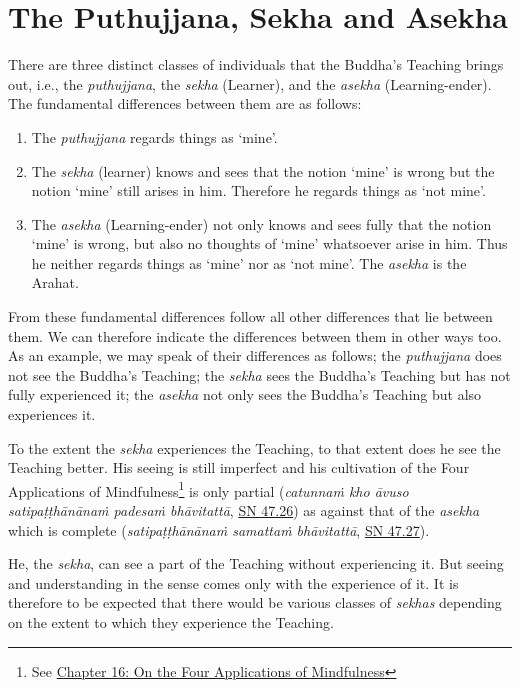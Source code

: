 \chapter{The Puthujjana, Sekha and Asekha}

There are three distinct classes of individuals that the Buddha's Teaching brings out, i.e., the \emph{puthujjana}, the \emph{sekha} (Learner), and the \emph{asekha} (Learning-ender). The fundamental differences between them are as follows:

\begin{enumerate}
\item
  The \emph{puthujjana} regards things as `mine'.
\item
  The \emph{sekha} (learner) knows and sees that the notion `mine' is wrong but the notion `mine' still arises in him. Therefore he regards things as `not mine'.
\item
  The \emph{asekha} (Learning-ender) not only knows and sees fully that the notion `mine' is wrong, but also no thoughts of `mine' whatsoever arise in him. Thus he neither regards things as `mine' nor as `not mine'. The \emph{asekha} is the Arahat.
\end{enumerate}

From these fundamental differences follow all other differences that lie between them. We can therefore indicate the differences between them in other ways too. As an example, we may speak of their differences as follows; the \emph{puthujjana} does not see the Buddha's Teaching; the \emph{sekha} sees the Buddha's Teaching but has not fully experienced it; the \emph{asekha} not only sees the Buddha's Teaching but also  experiences it.

To the extent the \emph{sekha} experiences the Teaching, to that extent does he see the Teaching better. His seeing is still imperfect and his cultivation of the Four Applications of Mindfulness\footnote{See \href{ch-16-satipatthana.xml\#start}{Chapter 16: On the Four Applications of Mindfulness}} is only partial (\emph{catunnaṁ kho āvuso satipaṭṭhānānaṁ padesaṁ bhāvitattā}, \href{https://suttacentral.net/sn47.26/en/bodhi}{SN 47.26}) as against that of the \emph{asekha} which is complete (\emph{satipaṭṭhānānaṁ samattaṁ bhāvitattā}, \href{https://suttacentral.net/sn47.27/en/bodhi}{SN 47.27}).

He, the \emph{sekha}, can see a part of the Teaching without experiencing it. But seeing and understanding in the  sense comes only with the experience of it. It is therefore to be expected that there would be various classes of \emph{sekhas} depending on the extent to which they experience the Teaching.

